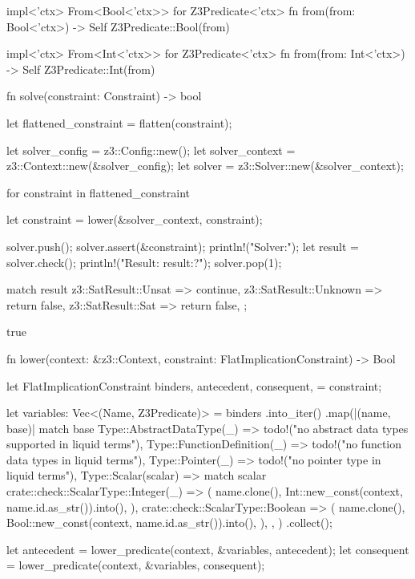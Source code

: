 \documentclass[
  oneside,
  english,
  coorientadorbanca,
  noabntexcite
]{ufsc-thesis-rn46-2019}
\begin{document}
\begin{rustcode}
impl<'ctx> From<Bool<'ctx>> for Z3Predicate<'ctx> {
    fn from(from: Bool<'ctx>) -> Self {
        Z3Predicate::Bool(from)
    }
}

impl<'ctx> From<Int<'ctx>> for Z3Predicate<'ctx> {
    fn from(from: Int<'ctx>) -> Self {
        Z3Predicate::Int(from)
    }
}

fn solve(constraint: Constraint) -> bool {
    let flattened_constraint = flatten(constraint);

    let solver_config = z3::Config::new();
    let solver_context = z3::Context::new(&solver_config);
    let solver = z3::Solver::new(&solver_context);

    for constraint in flattened_constraint {
        let constraint = lower(&solver_context, constraint);

        solver.push();
        solver.assert(&constraint);
        println!("Solver:");
        let result = solver.check();
        println!("Result: {result:?}");
        solver.pop(1);

        match result {
            z3::SatResult::Unsat => continue,
            z3::SatResult::Unknown => return false,
            z3::SatResult::Sat => return false,
        };
    }

    true
}

fn lower(context: &z3::Context, constraint: FlatImplicationConstraint) -> Bool {
    let FlatImplicationConstraint {
        binders,
        antecedent,
        consequent,
    } = constraint;

    let variables: Vec<(Name, Z3Predicate)> = binders
        .into_iter()
        .map(|(name, base)| match base {
            Type::AbstractDataType(_) => todo!("no abstract data types supported in liquid terms"),
            Type::FunctionDefinition(_) => todo!("no function data types in liquid terms"),
            Type::Pointer(_) => todo!("no pointer type in liquid terms"),
            Type::Scalar(scalar) => match scalar {
                crate::check::ScalarType::Integer(_) => (
                    name.clone(),
                    Int::new_const(context, name.id.as_str()).into(),
                ),
                crate::check::ScalarType::Boolean => (
                    name.clone(),
                    Bool::new_const(context, name.id.as_str()).into(),
                ),
            },
        })
        .collect();

    let antecedent = lower_predicate(context, &variables, antecedent);
    let consequent = lower_predicate(context, &variables, consequent);

}
\end{rustcode}
\end{document}
